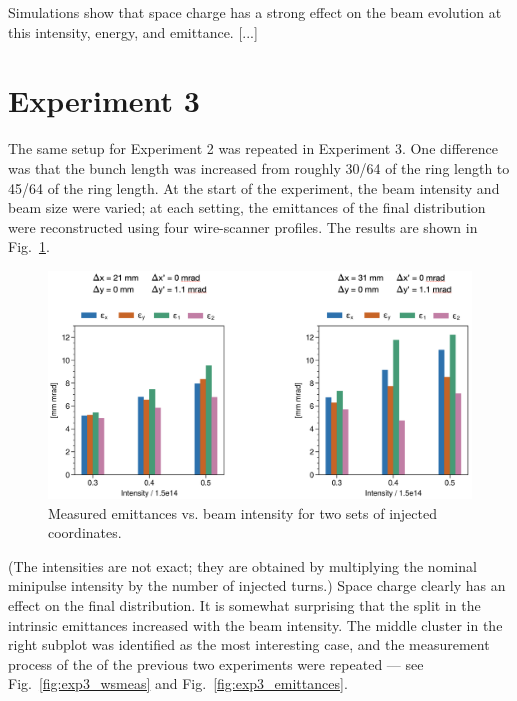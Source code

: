 Simulations show that space charge has a strong effect on the beam evolution at this intensity, energy, and emittance. [...]










\section{Experiment 3}

The same setup for Experiment 2 was repeated in Experiment 3. One difference was that the bunch length was increased from roughly 30/64 of the ring length to 45/64 of the ring length. At the start of the experiment, the beam intensity and beam size were varied; at each setting, the emittances of the final distribution were reconstructed using four wire-scanner profiles. The results are shown in Fig.~\ref{fig:exp3_search}.
%
\begin{figure}[!p]
    \centering
    \includegraphics[width=\textwidth]{Images/chapter5/exp3/search.png}
    \caption{Measured emittances vs. beam intensity for two sets of injected coordinates.}
    \label{fig:exp3_search}
\end{figure}
%
(The intensities are not exact; they are obtained by multiplying the nominal minipulse intensity by the number of injected turns.) Space charge clearly has an effect on the final distribution. It is somewhat surprising that the split in the intrinsic emittances increased with the beam intensity. The middle cluster in the right subplot was identified as the most interesting case, and the measurement process of the  of the previous two experiments were repeated — see Fig.~\ref{fig:exp3_wsmeas} and Fig.~\ref{fig:exp3_emittances}.
%
